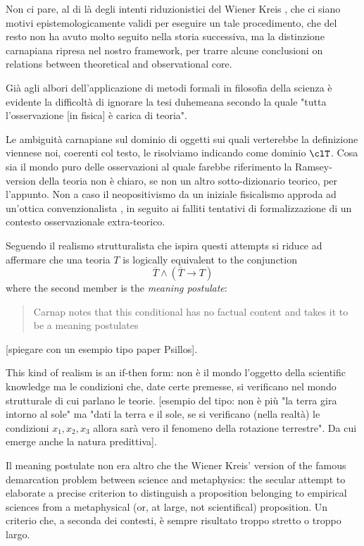 Non ci pare, al di là degli intenti riduzionistici del Wiener Kreis \cite{Weinb}, che ci siano motivi epistemologicamente validi per eseguire un tale procedimento, che del resto non ha avuto molto seguito nella storia successiva, ma la distinzione carnapiana ripresa nel nostro framework, per trarre alcune conclusioni on relations between theoretical and observational core.

Già agli albori dell'applicazione di metodi formali in filosofia della scienza è evidente la difficoltà di ignorare la tesi duhemeana secondo la quale "tutta l'osservazione [in fisica] è carica di teoria". 

Le ambiguità carnapiane sul dominio di oggetti sui quali verterebbe la definizione viennese noi, coerenti col testo, le risolviamo indicando come dominio $\clT$. Cosa sia il mondo puro delle osservazioni al quale farebbe riferimento la Ramsey-version della teoria non è chiaro, se non un altro sotto-dizionario teorico, per l'appunto. Non a caso il neopositivismo da un iniziale fisicalismo approda ad un'ottica convenzionalista \cite{?}, in seguito ai falliti tentativi di formalizzazione di un contesto osservazionale extra-teorico. 

Seguendo \cite{psillos} il realismo strutturalista che ispira questi attempts si riduce ad affermare che una teoria $T$ is logically equivalent to the conjunction
\[\overline{T} \land (\overline{T} \rightarrow T)
\] where the second member is the \emph{meaning postulate}:
\begin{quotation}
	Carnap notes that this conditional has no factual content and takes it to be a meaning postulates \cite{psillos}
\end{quotation}
[spiegare con un esempio tipo paper Psillos].

This kind of realism is an if-then form: non è il mondo l'oggetto della scientific knowledge ma le condizioni che, date certe premesse, si verificano nel mondo strutturale di cui parlano le teorie. [esempio del tipo: non è più "la terra gira intorno al sole" ma "dati la terra e il sole, se si verificano (nella realtà) le condizioni $x_1,x_2,x_3$ allora sarà vero il fenomeno della rotazione terrestre". Da cui emerge anche la natura predittiva]. 

Il meaning postulate non era altro che the Wiener Kreis' version of the famous demarcation problem between science and metaphysics: the secular attempt to elaborate a precise criterion to distinguish a proposition belonging to empirical sciences from a metaphysical (or, at large, not scientifical) proposition. Un criterio che, a seconda dei contesti, è sempre risultato troppo stretto o troppo largo. 

